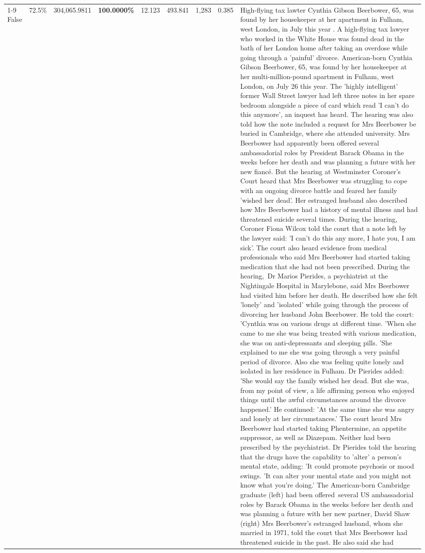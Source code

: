 \begin{table}[H]
\begin{tabular}{lllrlllll}
\cline{1-9}
False & 72.5\% & \color{red} 304,065.9811 & \bfseries \color{red} 100.0000\% & 12.123 & 493.841 & 1,283 & 0.385 & High-flying tax lawter Cynthia Gibson Beerbower, 65, was found by her housekeeper at her apartment in Fulham, west London, in July this year . A high-flying tax lawyer who worked in the White House was found dead in the bath of her London home after taking an overdose while going through a 'painful' divorce. American-born Cynthia Gibson Beerbower, 65, was found by her housekeeper at her multi-million-pound apartment in Fulham, west London, on July 26 this year. The 'highly intelligent' former Wall Street lawyer had left three notes in her spare bedroom alongside a piece of card which read 'I can't do this anymore', an inquest has heard. The hearing was also told how the note included a request for Mrs Beerbower be buried in Cambridge, where she attended university. Mrs Beerbower had apparently been offered several ambassadorial roles by President Barack Obama in the weeks before her death and was planning a future with her new fiancé. But the hearing at Westminster Coroner's Court heard that Mrs Beerbower was struggling to cope with an ongoing divorce battle and feared her family 'wished her dead'. Her estranged husband also described how Mrs Beerbower had a history of mental illness and had threatened suicide several times. During the hearing, Coroner Fiona Wilcox told the court that a note left by the lawyer said: 'I can't do this any more, I hate you, I am sick'. The court also heard evidence from medical professionals who said Mrs Beerbower had started taking medication that she had not been prescribed. During the hearing, Dr Marios Pierides, a psychiatrist at the Nightingale Hospital in Marylebone, said Mrs Beerbower had visited him before her death. He described how she felt 'lonely' and 'isolated' while going through the process of divorcing her husband John Beerbower. He told the court: 'Cynthia was on various drugs at different time. 'When she came to me she was being treated with various medication, she was on anti-depressants and sleeping pills. 'She explained to me she was going through a very painful period of divorce. Also she was feeling quite lonely and isolated in her residence in Fulham. Dr Pierides added: 'She would say the family wished her dead. But she was, from my point of view, a life affirming person who enjoyed things until the awful circumstances around the divorce happened.' He continued: 'At the same time she was angry and lonely at her circumstances.' The court heard Mrs Beerbower had started taking Phentermine, an appetite suppressor, as well as Diazepam. Neither had been prescribed by the psychiatrist. Dr Pierides told the hearing that the drugs have the capability to 'alter' a person's mental state, adding: 'It could promote psychosis or mood swings. 'It can alter your mental state and you might not know what you're doing.' The American-born Cambridge graduate (left) had been offered several US ambassadorial roles by Barack Obama in the weeks before her death and was planning a future with her new partner, David Shaw (right) Mrs Beerbower's estranged husband, whom she married in 1971, told the court that Mrs Beerbower had threatened suicide in the past. He also said she had 
\end{tabular}
\end{table}
